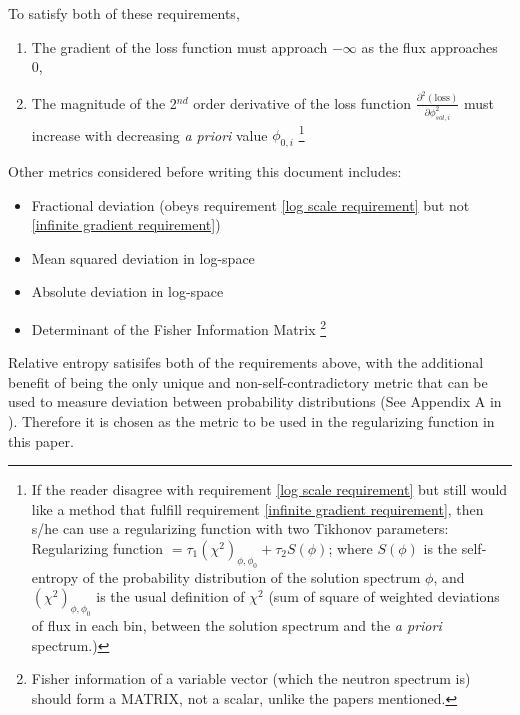\documentclass[a4paper, 12pt]{article}
\newcommand{\apriori}[0]{\textit{a priori} }
\begin{document}
    To satisfy both of these requirements,
    \begin{enumerate}
        \item The gradient of the loss function must approach $-\infty$ as the flux approaches 0, \label{infinite gradient requirement}
        \item The magnitude of the 2$^{nd}$ order derivative of the loss function $\frac{\partial^2 (\text{loss})}{\partial \phi_{sol,i}^2}$ must increase with decreasing \apriori value $\phi_{0,i}$ \label{log scale requirement}
        \footnote{If the reader disagree with requirement \ref{log scale requirement} but still would like a method that fulfill requirement \ref{infinite gradient requirement}, then s/he can use a regularizing function with two Tikhonov parameters: Regularizing function $= \tau_1 (\chi^2)_{\phi, \phi_0} + \tau_2 S(\phi)$; where $S(\phi)$ is the self-entropy of the probability distribution of the solution spectrum $\phi$, and $(\chi^2)_{\phi, \phi_0}$ is the usual definition of $\chi^2$ (sum of square of weighted deviations of flux in each bin, between the solution spectrum and the \apriori spectrum.)}
    \end{enumerate}

    Other metrics considered before writing this document includes:
    \begin{itemize}
        \item Fractional deviation (obeys requirement \ref{log scale requirement} but not \ref{infinite gradient requirement})
        \item Mean squared deviation in log-space
        \item Absolute deviation in log-space
        \item Determinant of the Fisher Information Matrix \footnote{Fisher information of a variable vector (which the neutron spectrum is) should form a MATRIX, not a scalar, unlike the papers \cite{FisherRegularisation}\cite{FirstResultsOfMFRJETNE213} mentioned.}
    \end{itemize}

    Relative entropy satisifes both of the requirements above, with the additional benefit of being the only unique and non-self-contradictory metric that can be used to measure deviation between probability distributions (See Appendix A in \cite{MAXED1998Reginatto}). Therefore it is chosen as the metric to be used in the regularizing function in this paper.
\end{document}
